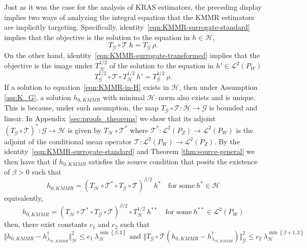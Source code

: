 \documentclass[twoside,11pt]{article}
\newcommand{\mc}{\mathcal}
\begin{document}
Just as it was the case for the analysis of KRAS estimators, the preceding display implies two ways of analyzing the integral equation that the KMMR estimators are implicitly targeting. Specifically, identity~\eqref{eqn:KMMR-surrogate-standard} implies that the objective is the solution to the equation in $h \in \mc{H}$,
\begin{equation}
T_\mc{G} \circ \mc{T} \:h=T_\mc{G} \: \rho.
\label{eqn:KMMR-in-H}
\end{equation}
On the other hand, identity~\eqref{eqn:KMMR-surrogate-transformed} implies that the objective is the image under $T_\mc{H}^{1/2} $ of the solution to the equation in $h' \in \mc{L}^2(P_W)$
\begin{equation}
T_\mc{G}^{1/2} \circ \mc{T} \circ T_\mc{H}^{1/2} \:h'=T_\mc{G}^{1/2} \: \rho.
\label{eqn:KMMR-in-L2}
\end{equation}
If a solution to equation~\eqref{eqn:KMMR-in-H} exists in $\mc{H}$, then under Assumption \ref{ass:K_G}, a solution $h_{0,KMMR}$ with minimal $\mc{H}$--norm also exists and is unique. This is because, under such assumption, the map $T_\mc{G} \circ \mc{T} : \mc{H} \rightarrow \mc{G}$ is bounded and linear. In Appendix~\ref{sec:proofs_theorems} we show that its adjoint $(T_\mc{G} \circ \mc{T})^* : \mc{G} \rightarrow \mc{H}$ is given by $T_\mc{H} \circ \mc{T}^*$ where $\mc{T}^*:\mc{L}^2(P_Z) \rightarrow \mc{L}^2(P_W)$ is the adjoint of the conditional mean operator $\mc{T}:\mc{L}^2(P_W) \rightarrow \mc{L}^2(P_Z)$. By the identity~\eqref{eqn:KMMR-surrogate-standard} and Theorem \ref{thm:source-general} we then have that if $h_{0,KMMR}$ satisfies the source condition that posits the existence of $\beta>0$ such that 
\begin{equation}
    h_{0,KMMR} = (T_\mc{H} \circ \mc{T}^*\circ  T_\mc{G} \circ \mc{T})^{\beta/2}\:h^{*} \quad \text{for some} \: h^{*} \in \mc{H}
    \label{cond:source-Mastouri-H}
\end{equation}
equivalently, 
\begin{equation}
    h_{0,KMMR} = (T_\mc{H} \circ \mc{T}^*\circ  T_\mc{G} \circ \mc{T})^{\beta/2} \circ T_{\mc{H}}^{1/2}\:h^{**} \quad \text{for some} \: h^{**} \in \mc{L}^2(P_W)
    \label{cond:source-Mastouri}
\end{equation}
then, there exist constants $c_1$ and $c_2$ such that
\begin{equation}
\Vert h_{0,KMMR} - h_{\lambda_{\mc{H},KMMR}}^\dag \Vert_{\mc{H}}^2 \le c_1 \:\lambda_\mc{H}^{\min\left\{\beta,2 \right\}}  \text{ and }  \Vert T_\mc{G} \circ \mc{T} (h_{0,KMMR} - h_{\lambda_{\mc{H},KMMR}}^\dag )\Vert_{\mc{G}}^2 \le c_2 \: \lambda_\mc{H}^{\min\left\{\beta+1,2 \right\}} 
\label{eqn:bound-strong-KMMR}
\end{equation}
\end{document}
